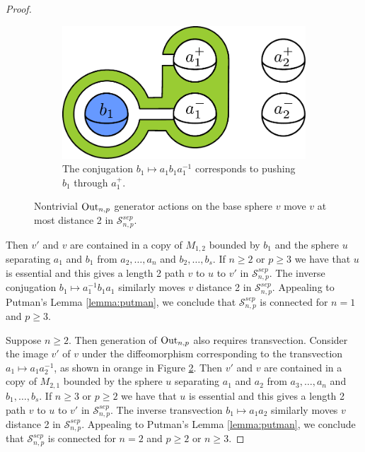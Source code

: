 \begin{proof}
\begin{figure}[b!]
\begin{subfigure}[t]{0.3\textwidth}
        \includegraphics[width=\textwidth]{figures/sepconnect2.pdf}
        \caption{The conjugation $b_1 \mapsto a_1b_1a_1^{-1}$
        corresponds to pushing
        $b_1$ through $a_1^+$.}
        \label{fig:sepconnect2}
    \end{subfigure}
    \caption{Nontrivial $\operatorname{Out}_{n,p}$ generator actions on the base sphere $v$
    move $v$ at most distance 2 in $\mathcal S^{sep}_{n,p}$.}
    \label{sepconnect}
\end{figure}


Then $v'$ and $v$ are contained in a copy of $M_{1,2}$ bounded by $b_1$
and the sphere $u$ separating $a_1$ and $b_1$ from
$a_2, \ldots, a_n$ and $b_2, \ldots, b_s$.
If $n\geq 2$ or $p\geq 3$ we have that $u$
is essential and this gives a length 2 path $v$ to $u$ to $v'$ in $\mathcal {S}^{sep}_{n,p}$.
The inverse conjugation $b_1 \mapsto a_1^{-1}b_1a_1$ similarly
moves $v$ distance 2 in $\mathcal {S}^{sep}_{n,p}$.
Appealing to Putman's Lemma \ref{lemma:putman}, we conclude that
$\mathcal {S}^{sep}_{n,p}$ is connected for $n=1$ and $p\geq 3$.

Suppose $n \geq 2$.
Then generation of $\operatorname{Out}_{n,p}$ also requires transvection.
Consider the image $v'$ of $v$ under the
diffeomorphism corresponding to
the transvection $a_1 \mapsto a_1a_2^{-1}$,
as shown in orange in Figure \ref{sepconnect}.
Then $v'$ and $v$ are contained in a copy of $M_{2,1}$ bounded by
the sphere $u$ separating $a_1$ and $a_2$ from
$a_3, \ldots, a_n$ and $b_1, \ldots, b_s$.
If $n\geq 3$ or $p\geq 2$ we have that $u$
is essential and this gives a length 2 path $v$ to $u$ to $v'$ in $\mathcal {S}^{sep}_{n,p}$.
The inverse transvection $b_1 \mapsto a_1a_2$ similarly
moves $v$ distance 2 in $\mathcal {S}^{sep}_{n,p}$.
Appealing to Putman's Lemma \ref{lemma:putman}, we conclude that
$\mathcal {S}^{sep}_{n,p}$ is connected for $n=2$ and $p\geq 2$ or $n\geq 3$.





\end{proof}

